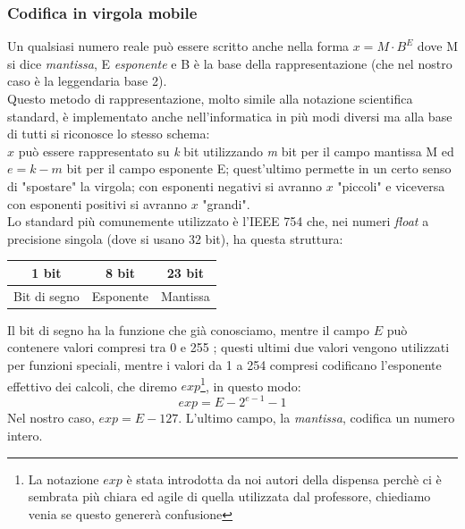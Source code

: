 \documentclass[class=book, crop=false]{standalone}
\begin{document}
\subsubsection{Codifica in virgola mobile}
Un qualsiasi numero reale può essere scritto anche nella forma $x=M\cdot B^{E}$ dove M si dice \emph{mantissa}, E \emph{esponente} e B è la base della rappresentazione (che nel nostro caso è la leggendaria base 2).\\
Questo metodo di rappresentazione, molto simile alla notazione scientifica standard, è implementato anche nell'informatica in più modi diversi ma alla base di tutti si riconosce lo stesso schema: \\
$x$ può essere rappresentato su \emph{k} bit utilizzando \emph{m} bit per il campo mantissa M ed $e=k-m$ bit per il campo esponente E; quest'ultimo permette in un certo senso di "spostare" la virgola; con esponenti negativi si avranno $x$ "piccoli" e viceversa con esponenti positivi si avranno $x$ "grandi".\\
Lo standard più comunemente utilizzato è l'IEEE 754 che, nei numeri \emph{float} a precisione singola (dove si usano 32 bit), ha questa struttura:
\begin{table}[h!]
	\centering
	\begin{tabular}{|l|l|l|}
		\hline
		\multicolumn{1}{|c|}{1 bit} & \multicolumn{1}{c|}{8 bit} & \multicolumn{1}{c|}{23 bit} \\ \hline
		Bit di segno                & Esponente                  & Mantissa                    \\ \hline
	\end{tabular}
\end{table}


Il bit di segno ha la funzione che già conosciamo, mentre il campo $E$ può contenere valori compresi tra 0 e 255%
; questi ultimi due valori vengono utilizzati per funzioni speciali, mentre i valori da 1 a 254 compresi codificano l'esponente effettivo dei calcoli, che diremo $exp$\footnote{La notazione $exp$ è stata introdotta da noi autori della dispensa perchè ci è sembrata più chiara ed agile di quella utilizzata dal professore, chiediamo venia se questo genererà confusione}, in questo modo:
\begin{equation*}
exp=E-2^{e-1}-1
\end{equation*}
Nel nostro caso, $exp=E-127$. L'ultimo campo, la \emph{mantissa}, codifica un numero intero.
\end{document}

